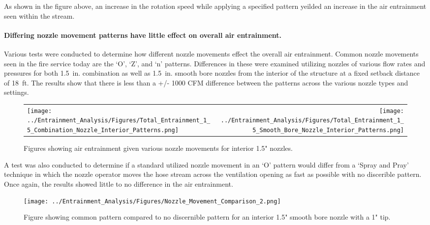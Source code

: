 \documentclass{article}
\begin{document}
As shown in the figure above, an increase in the rotation speed while applying a specified pattern yeilded an increase in the air entrainment seen within the stream.

\clearpage

\paragraph{Differing nozzle movement patterns have little effect on overall air entrainment.} \mbox{}

Various tests were conducted to determine how different nozzle movements effect the overall air entrainment. Common nozzle movements seen in the fire service today are the `O', `Z', and `n' patterns. Differences in these were examined utilizing nozzles of various flow rates and pressures for both 1.5~in. combination as well as 1.5~in. smooth bore nozzles from the interior of the structure at a fixed setback distance of 18~ft. The results show that there is less than a +/- 1000 CFM difference between the patterns across the various nozzle types and settings.

\begin{figure}[!ht]
\begin{tabular*}{\textwidth}{lr}
\texttt{[image: ../Entrainment\_Analysis/Figures/Total\_Entrainment\_1\_5\_Combination\_Nozzle\_Interior\_Patterns.png]} &
\texttt{[image: ../Entrainment\_Analysis/Figures/Total\_Entrainment\_1\_5\_Smooth\_Bore\_Nozzle\_Interior\_Patterns.png]} \\
\end{tabular*}
\caption{Figures showing air entrainment given various nozzle movements for interior 1.5" nozzles.}
\label{fig:1_5_Interior_Nozzle_Movement_Comparison}
\end{figure}

A test was also conducted to determine if a standard utilized nozzle movement in an `O' pattern would differ from a `Spray and Pray' technique in which the nozzle operator moves the hose stream across the ventilation opening as fast as possible with no discerible pattern. Once again, the results showed little to no difference in the air entrainment.

\begin{figure}[!ht]
	\centering
	\texttt{[image: ../Entrainment\_Analysis/Figures/Nozzle\_Movement\_Comparison\_2.png]}
	\caption{Figure showing common pattern compared to no discernible pattern for an interior 1.5" smooth bore nozzle with a 1" tip.}
	\label{fig:1_5_Interior_Nozzle_Movement_PatterntoNoPattern_Comparison}
\end{figure}
\end{document}
